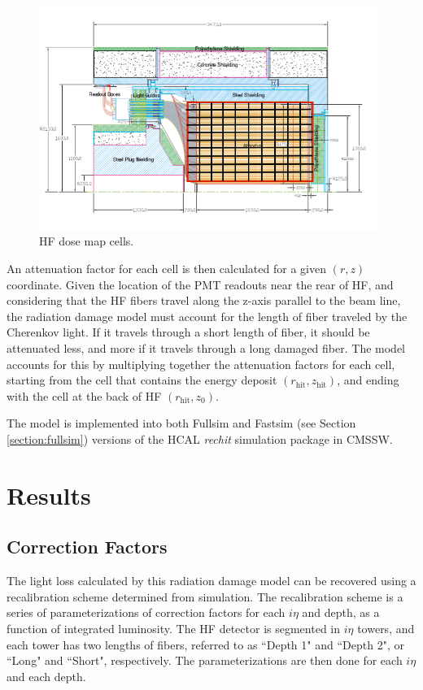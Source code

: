 			\begin{figure}[!ht]
				\begin{center}
					\includegraphics[width=0.98\textwidth]{figures/Ch_4_raddam/DoseMap.png}
					\caption{HF dose map cells.}
					\label{fig:hfcells}
				\end{center}
			\end{figure}
			
			An attenuation factor for each cell is then calculated for a given $(r, z)$ coordinate.  Given the location of the PMT readouts near the rear of HF, and considering that the HF fibers travel along the z-axis parallel to the beam line, the radiation damage model must account for the length of fiber traveled by the Cherenkov light.  If it travels through a short length of fiber, it should be attenuated less, and more if it travels through a long damaged fiber.  The model accounts for this by multiplying together the attenuation factors for each cell, starting from the cell that contains the energy deposit $(r_{\text{hit}}, z_{\text{hit}})$, and ending with the cell at the back of HF $(r_{\text{hit}}, z_{0})$.
			
			The model is implemented into both Fullsim and Fastsim (see Section \ref{section:fullsim}) versions of the HCAL \textit{rechit} simulation package in CMSSW.
		
	\section{Results}
		\subsection{Correction Factors}		
			The light loss calculated by this radiation damage model can be recovered using a recalibration scheme determined from simulation.  The recalibration scheme is a series of parameterizations of correction factors for each $i\eta$ and depth, as a function of integrated luminosity.  The HF detector is segmented in $i\eta$ towers, and each tower has two lengths of fibers, referred to as ``Depth 1" and ``Depth 2", or ``Long" and ``Short", respectively.  The parameterizations are then done for each $i\eta$ and each depth.  
			
